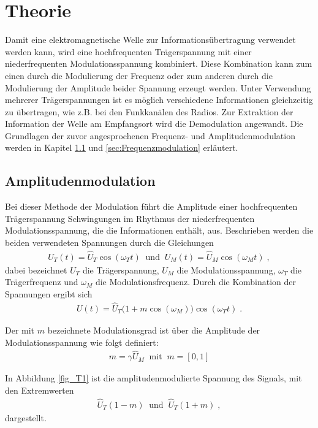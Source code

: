 \section{Theorie}
\label{sec:Theorie}

Damit eine elektromagnetische Welle zur Informationsübertragung verwendet werden kann, wird eine hochfrequenten Trägerspannung mit einer niederfrequenten Modulationsspannung kombiniert. Diese Kombination kann zum einen durch die Modulierung der Frequenz oder zum anderen durch die Modulierung der Amplitude beider Spannung erzeugt werden. Unter Verwendung mehrerer Trägerspannungen ist es möglich verschiedene Informationen gleichzeitig zu übertragen, wie z.B. bei den Funkkanälen des Radios. Zur Extraktion der Information der Welle am Empfangsort wird die Demodulation angewandt. Die Grundlagen der zuvor angesprochenen Frequenz- und Amplitudenmodulation werden in Kapitel \ref{sec:Amplitudenmodulation} und \ref{sec:Frequenzmodulation} erläutert.

\subsection{Amplitudenmodulation}
\label{sec:Amplitudenmodulation}

Bei dieser Methode der Modulation führt die Amplitude einer hochfrequenten Trägerspannung Schwingungen im Rhythmus der niederfrequenten Modulationsspannung, die die Informationen enthält, aus. Beschrieben werden die beiden verwendeten Spannungen durch die Gleichungen 
\begin{align}
	U_T(t)=\hat{U}_T\cos{(\omega_Tt)} \;\; \text{und} \;\; U_M(t)=\hat{U}_M\cos{(\omega_Mt)}\; ,
\end{align}
dabei bezeichnet $U_T$ die Trägerspannung, $U_M$ die Modulationsspannung, $\omega_T$ die Trägerfrequenz und $\omega_M$ die Modulationsfrequenz. Durch die Kombination der Spannungen ergibt sich
\begin{align}
	U(t)=\hat{U}_T\Big(1+m\cos{(\omega_M)}\Big)\cos{(\omega_Tt)}\;.
	\label{eq:1}
\end{align}

Der mit $m$ bezeichnete Modulationsgrad ist über die Amplitude der Modulationsspannung wie folgt definiert:
\begin{align}
	m=\gamma\hat{U}_M \;\; \text{mit} \;\; m= [0,1]
\end{align} 

In Abbildung \ref{fig_T1} ist die amplitudenmodulierte Spannung des Signals, mit den Extremwerten 
\begin{align}
	\hat{U}_T(1-m) \;\; \text{und} \;\; \hat{U}_T(1+m)\;,
\end{align}
dargestellt. 

